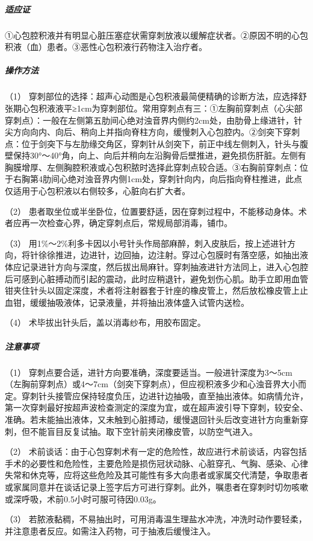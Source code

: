 \subparagraph{适应证}

①心包腔积液并有明显心脏压塞症状需穿刺放液以缓解症状者。②原因不明的心包积液（血）患者。③恶性心包积液行药物注入治疗者。

\subparagraph{操作方法}

（1）
穿刺部位的选择：超声心动图是心包积液最简便精确的诊断方法，应选择舒张期心包积液液平≥1cm为穿刺部位。常用穿刺点有三：①左胸前穿刺点（心尖部穿刺点）：一般在左侧第五肋间心绝对浊音界内侧约2cm处，由肋骨上缘进针，针尖方向向内、向后、稍向上并指向脊柱方向，缓慢刺入心包腔内。②剑突下穿刺点：位于剑突下与左肋缘交角区，穿刺针从剑突下，前正中线左侧刺入，针头与腹壁保持30°～40°角，向上、向后并稍向左沿胸骨后壁推进，避免损伤肝脏。左侧有胸膜增厚、左侧胸腔积液或心包积脓时选择此穿刺点较合适。③右胸前穿刺点：位于右胸第4肋间心绝对浊音界内侧1cm处，穿刺针向内，向后指向脊柱推进，此点仅适用于心包积液以右侧较多，心脏向右扩大者。

（2）
患者取坐位或半坐卧位，位置要舒适，因在穿刺过程中，不能移动身体。术者应再一次检查心界，确定穿刺点后，常规局部消毒，铺巾。

（3）
用1\%～2\%利多卡因以小号针头作局部麻醉，刺入皮肤后，按上述进针方向，将针徐徐推进，边进针，边回抽，边注射。穿过心包膜时有落空感，如抽出液体应记录进针方向与深度，然后拔出局麻针。穿刺抽液进针方法同上，进入心包腔后可感到心脏搏动而引起的震动，此时应稍退针，避免划伤心肌。助手立即用血管钳夹住针头以固定深度，术者将注射器套于针座的橡皮管上，然后放松橡皮管上止血钳，缓缓抽吸液体，记录液量，并将抽出液体盛入试管内送检。

（4） 术毕拔出针头后，盖以消毒纱布，用胶布固定。

\subparagraph{注意事项}

（1）
穿刺点要合适，进针方向要准确，深度要适当。一般进针深度为3～5cm（左胸前穿刺点）或4～7cm（剑突下穿刺点），但应视积液多少和心浊音界大小而定。穿刺针头接管应保持轻度负压，边进针边抽吸，直至抽出液体。如病情允许，第一次穿刺最好按超声波检查测定的深度为宜，或在超声波引导下穿刺，较安全、准确。若未能抽出液体，又未触到心脏搏动，缓慢退回针头后改变进针方向重新穿刺，但不能盲目反复试抽。取下空针前夹闭橡皮管，以防空气进入。

（2）
术前谈话：由于心包穿刺术有一定的危险性，故应进行术前谈话，内容包括手术的必要性和危险性，主要危险是损伤冠状动脉、心脏穿孔、气胸、感染、心律失常和休克等，应将这些危险及其可能性有多大向患者或家属交代清楚，争取患者或家属同意并在谈话记录上签字后方可进行穿刺。此外，嘱患者在穿刺时切勿咳嗽或深呼吸，术前0.5小时可服可待因0.03g。

（3）
若脓液黏稠，不易抽出时，可用消毒温生理盐水冲洗，冲洗时动作要轻柔，并注意患者反应。如需注入药物，可于抽液后缓慢注入。

